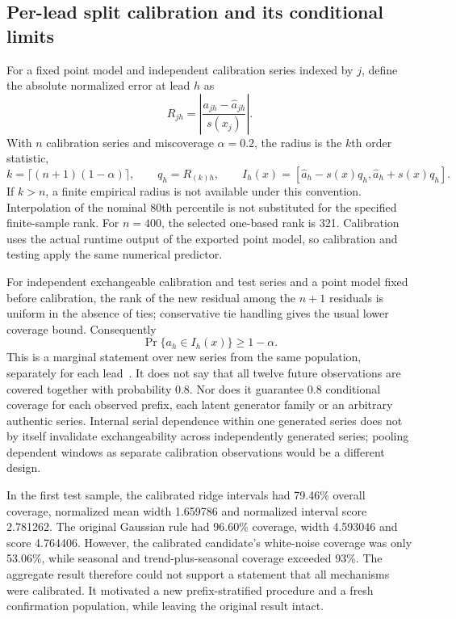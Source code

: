 \subsection{Per-lead split calibration and its conditional limits}
\label{sec:browser-split}

For a fixed point model and independent calibration series indexed by $j$,
define the absolute normalized error at lead $h$ as
\begin{equation}
 R_{jh}=\left|\frac{a_{jh}-\hat a_{jh}}{s(x_j)}\right|.
 \label{eq:browser-residual}
\end{equation}
With $n$ calibration series and miscoverage $\alpha=0.2$, the radius is the
$k$th order statistic,
\begin{equation}
 k=\lceil(n+1)(1-\alpha)\rceil,\qquad
 q_h=R_{(k)h},\qquad
 I_h(x)=[\hat a_h-s(x)q_h,\hat a_h+s(x)q_h].
 \label{eq:browser-radius}
\end{equation}
If $k>n$, a finite empirical radius is not available under this convention.
Interpolation of the nominal 80th percentile is not substituted for the
specified finite-sample rank. For $n=400$, the selected one-based rank is 321.
Calibration uses the actual runtime output of the exported point model, so
calibration and testing apply the same numerical predictor.

For independent exchangeable calibration and test series and a point model
fixed before calibration, the rank of the new residual among the $n+1$
residuals is uniform in the absence of ties; conservative tie handling gives
the usual lower coverage bound. Consequently
\begin{equation}
 \Pr\{a_h\in I_h(x)\}\geq 1-\alpha.
 \label{eq:browser-marginal-guarantee}
\end{equation}
This is a marginal statement over new series from the same population,
separately for each lead~\cite{splitintro}. It does not say that all twelve
future observations are covered together with probability 0.8. Nor does it
guarantee 0.8 conditional coverage for each observed prefix, each latent
generator family or an arbitrary authentic series. Internal serial dependence
within one generated series does not by itself invalidate exchangeability
across independently generated series; pooling dependent windows as separate
calibration observations would be a different design.

In the first test sample, the calibrated ridge intervals had 79.46\% overall
coverage, normalized mean width 1.659786 and normalized interval score 2.781262.
The original Gaussian rule had 96.60\% coverage, width 4.593046 and score
4.764406. However, the calibrated candidate's white-noise coverage was only
53.06\%, while seasonal and trend-plus-seasonal coverage exceeded 93\%.
The aggregate result therefore could not support a statement that all
mechanisms were calibrated. It motivated a new prefix-stratified procedure
and a fresh confirmation population, while leaving the original result intact.

